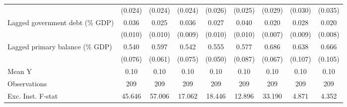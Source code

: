 {\begin{tabular}{l*{8}{c}}
                    &     (0.024)         &     (0.024)         &     (0.024)         &     (0.026)         &     (0.025)         &     (0.029)         &     (0.030)         &     (0.035)         \\
\addlinespace
Lagged government debt (\% GDP)&       0.036\sym{***}&       0.025\sym{**} &       0.036\sym{***}&       0.027\sym{**} &       0.040\sym{***}&       0.020\sym{***}&       0.028\sym{***}&       0.020\sym{***}\\
                    &     (0.010)         &     (0.010)         &     (0.009)         &     (0.010)         &     (0.010)         &     (0.007)         &     (0.009)         &     (0.008)         \\
\addlinespace
Lagged primary balance (\% GDP)&       0.540\sym{***}&       0.597\sym{***}&       0.542\sym{***}&       0.555\sym{***}&       0.577\sym{***}&       0.686\sym{***}&       0.638\sym{***}&       0.666\sym{***}\\
                    &     (0.076)         &     (0.061)         &     (0.075)         &     (0.050)         &     (0.087)         &     (0.067)         &     (0.107)         &     (0.105)         \\
\midrule
Mean Y              &        0.10         &        0.10         &        0.10         &        0.10         &        0.10         &        0.10         &        0.10         &        0.10         \\
Observations        &         209         &         209         &         209         &         209         &         209         &         209         &         209         &         209         \\
Exc. Inst. F-stat   &      45.646         &      57.006         &      17.062         &      18.446         &      12.896         &      33.190         &       4.871         &       4.352         \\
\bottomrule
\end{tabular}
}
